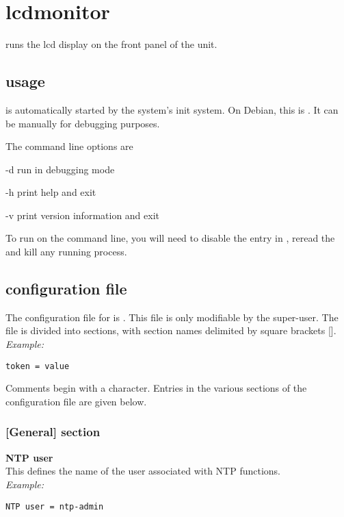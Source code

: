 \section{lcdmonitor \label{slcdmonitor}}

 runs the lcd display on the front panel of the  unit.

\subsection{usage}
 is automatically started by the system's init system.
On Debian, this is . It can be manually for debugging purposes.

The command line options are
\begin{description*}
	\item[-d]	run in debugging mode
	\item[-h]	print help and exit
	\item[-v]	print version information and exit
\end{description*}
To run  on the command line, you will need to disable the entry in ,
reread the  and kill any running  process.

\subsection{configuration file}

The configuration file for  is . This file is
only modifiable by the super-user. The file is divided into
sections, with section names delimited by square brackets [\space]. \\
\textit{Example:}
\begin{lstlisting}
token = value
\end{lstlisting}
Comments begin with a \cc{\#} character. Entries in the various sections of the configuration file
are given below. 

\subsubsection{[General] section}

{\bfseries NTP user}\\
This  defines the name of the user associated with NTP functions.\\
\textit{Example:}
\begin{lstlisting}
NTP user = ntp-admin
\end{lstlisting}

